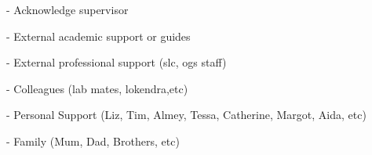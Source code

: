 



\cleardoublepage


%

\cleardoublepage



\begin{acknowledgements}
\addchaptertocentry{\acknowledgementname} %

- Acknowledge supervisor

- External academic support or guides

- External professional support (slc, ogs staff)

- Colleagues (lab mates, lokendra,etc)

- Personal Support (Liz, Tim, Almey, Tessa, Catherine, Margot, Aida, etc)

- Family (Mum, Dad, Brothers, etc)

\end{acknowledgements}